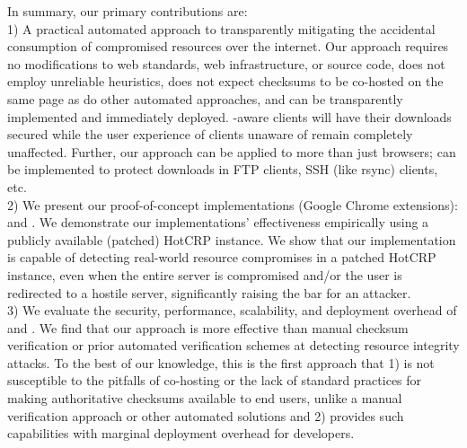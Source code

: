 In summary, our primary contributions are: \\

1) A practical automated approach to transparently mitigating the accidental
consumption of compromised resources over the internet. Our approach requires no
modifications to web standards, web infrastructure, or source code, does not
employ unreliable heuristics, does not expect checksums to be co-hosted on the
same page as do other automated approaches, and can be transparently implemented
and immediately deployed. \SYSTEM{}-aware clients will have their downloads
secured while the user experience of clients unaware of \SYSTEM{} remain
completely unaffected. Further, our approach can be applied to more than just
browsers; \SYSTEM{} can be implemented to protect downloads in FTP clients, SSH
(like rsync) clients, etc. \\

2) We present our proof-of-concept \SYSTEM{} implementations (Google Chrome
extensions): \DNSSYS{} and \DHTSYS{}. We demonstrate our implementations'
effectiveness empirically using a publicly available (patched) HotCRP instance.
We show that our \DNSSYS{} implementation is capable of detecting real-world
resource compromises in a patched HotCRP instance, even when the entire server
is compromised and/or the user is redirected to a hostile server, significantly
raising the bar for an attacker. \\

3) We evaluate the security, performance, scalability, and deployment overhead
of \DNSSYS{} and \DHTSYS{}. We find that our approach is more effective than
manual checksum verification or prior automated verification schemes at
detecting resource integrity attacks. To the best of our knowledge, this is the
first approach that 1) is not susceptible to the pitfalls of co-hosting or the
lack of standard practices for making authoritative checksums available to end
users, unlike a manual verification approach or other automated solutions and 2)
provides such capabilities with marginal deployment overhead for developers.

